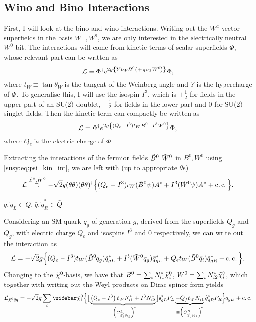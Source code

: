 \documentclass[../main.tex]{subfiles}
\begin{document}
\subsection{Wino and Bino Interactions}
First, I will look at the bino and wino interactions. Writing out the \(W^a\)
vector superfields in the basis \(W^\pm, W^0\), we are only interested in the
electrically neutral \(W^0\) bit. The interactions will come from kinetic terms
of scalar superfields \(\Phi\), whose relevant part can be written as
\begin{equation}
  \L = \Phi^\dagger \exp{2g\cclosed{Y t_W B^0 \pclosed{+ \frac{1}{2}\sigma_3 W^0}}} \Phi,
\end{equation}
where \(t_W \equiv \tan\theta_W\) is the tangent of the Weinberg angle and \(Y\) is the hypercharge of \(\Phi\).
To generalise this, I will use the isospin \(I^3\), which is \(+\frac{1}{2}\) for fields in the upper part of an SU(2) doublet, \(-\frac{1}{2}\) for fields in the lower part and 0 for SU(2) singlet fields.
Then the kinetic term can compactly be written as
\begin{equation}
  \L = \Phi^\dagger \exp{2g\cclosed{(Q_e - I^3) t_W B^0 + I^3 W^0}} \Phi,
\end{equation}
where \(Q_e\) is the electric charge of \(\Phi\).
\medskip

Extracting the interactions of the fermion fields \(\bino, \wino\) in \(B^0,
W^0\) using \cref{susy:eq:psi_kin_int}, we are left with (up to appropriate
\(\theta\)s)
\begin{equation}
  \L \stackrel{\bino, \wino}{\supset} -\sqrt{2}g (\theta\theta)(\theta\theta)^\dagger \Big\{ (Q_e - I^3)t_W (\bino \psi) A^\ast + I^3 (\wino \psi) A^\ast + \cc \Big\}.
\end{equation}

\begin{temporary}
  \(q, \tilde{q}_L \in Q\), \(\bar{q}, \tilde{q}_R^\ast \in \bar{Q}\)
\end{temporary}

Considering an SM quark \(q_g\) of generation \(g\), derived from the superfields \(Q_g\) and \(\bar{Q}_g\), with
electric charge \(Q_e\) and isospins \(I^3\) and 0 respectively, we can write out the interaction as
\begin{equation}
  \L = -\sqrt{2}g \Big\{ (Q_e - I^3)t_W (\bino q_g) \tilde{q}_{gL}^\ast + I^3 (\wino q_g) \tilde{q}_{gL}^\ast + Q_e t_W (\bino \bar{q}_i) \tilde{q}_{gR}^\ast + \cc \Big\}.
\end{equation}
Changing to the \(\nino\)-basis, we have that \(\bino = \sum_i N_{i1}^\ast \nino[i]\), \(\wino = \sum_i N_{i2}^\ast \nino[i]\), which together with writing out the Weyl products on Dirac spinor form yields
\begin{equation}
  \label{susy:eq:nino_sf_f_int}
  \L_{\tilde{\chi}^0 \tilde{q}q} = -\sqrt{2} g \sum_{i} \barnino[i] \Big\{ \big[ \underbrace{\pclosed{Q_e - I^3}t_W N_{i1}^\ast  + I^3 N_{i2}^\ast}_{\equiv \Big(C_{\tilde{\chi}^0_i \tilde{q} q_g}^{L}\Big)^{\!\ast}} \big] \wtilde{q}_{gL}^\ast P_L \underbrace{- Q_f t_W N_{i1}}_{\equiv \Big(C_{\tilde{\chi}^0_i \tilde{q} q_g}^{R}\Big)^{\!\ast}} \wtilde{q}_{gR}^\ast P_R \Big\} q_{gD} + \cc
\end{equation}
\end{document}
